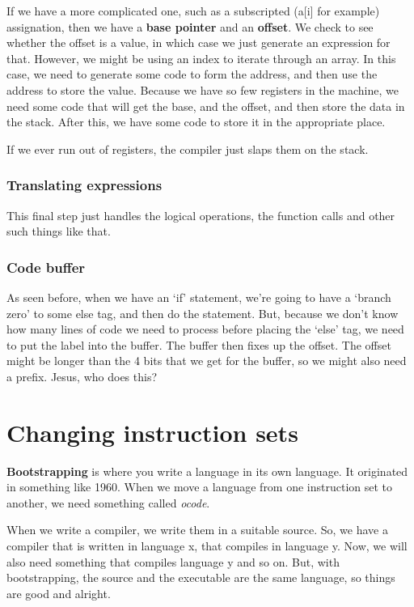 \documentclass[11pt,a4paper,titlepage,dvipsnames,cmyk]{scrartcl}
\begin{document}
If we have a more complicated one, such as a subscripted (a[i] for
example) assignation, then we have a \textbf{base pointer} and an
\textbf{offset}. We check to see whether the offset is a value, in which
case we just generate an expression for that. However, we might be using
an index to iterate through an array. In this case, we need to generate
some code to form the address, and then use the address to store the
value. Because we have so few registers in the machine, we need some code
that will get the base, and the offset, and then store the data in the
stack. After this, we have some code to store it in the appropriate place.

If we ever run out of registers, the compiler just slaps them on the
stack.

\subsubsection{Translating expressions}%
\label{ssub:expressoins}
This final step just handles the logical operations, the function calls
and other such things like that.

\subsubsection{Code buffer}%
\label{ssub:buffer}
As seen before, when we have an `if' statement, we're going to have a
`branch zero' to some else tag, and then do the statement. But, because we
don't know how many lines of code we need to process before placing the
`else' tag, we need to put the label into the buffer. The buffer then
fixes up the offset. The offset might be longer than the 4 bits that we
get for the buffer, so we might also need a prefix. Jesus, who does this?

\section{Changing instruction sets}%
\label{sec:changing-sets}
\textbf{Bootstrapping} is where you write a language in its own language.
It originated in something like 1960. When we move a language from one
instruction set to another, we need something called \textit{ocode}.

When we write a compiler, we write them in a suitable source. So, we have
a compiler that is written in language x, that compiles in language y.
Now, we will also need something that compiles language y and so on. But,
with bootstrapping, the source and the executable are the same language,
so things are good and alright.
\end{document}
